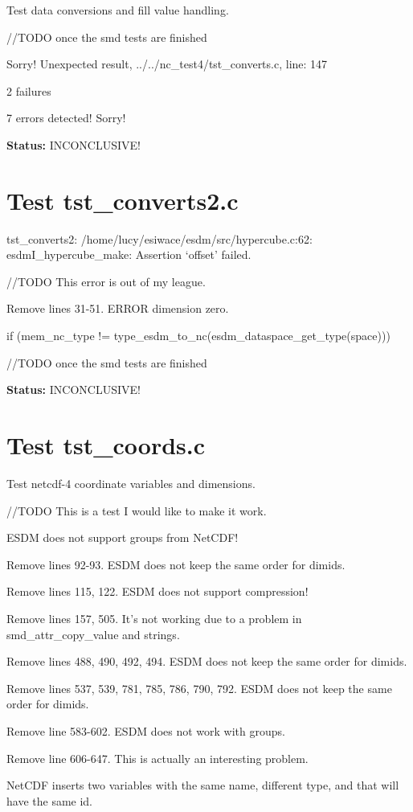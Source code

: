 Test data conversions and fill value handling.

//TODO once the smd tests are finished

Sorry! Unexpected result, ../../nc\_test4/tst\_converts.c, line: 147

2 failures

7 errors detected! Sorry!

{\bf \large Status: } INCONCLUSIVE!

\section{Test tst\_converts2.c}

tst\_converts2: /home/lucy/esiwace/esdm/src/hypercube.c:62: esdmI\_hypercube\_make: Assertion `offset' failed.

//TODO This error is out of my league.

Remove lines 31-51. ERROR dimension zero.

if (mem\_nc\_type != type\_esdm\_to\_nc(esdm\_dataspace\_get\_type(space)))

//TODO once the smd tests are finished

{\bf \large Status: } INCONCLUSIVE!

\section{Test tst\_coords.c}

Test netcdf-4 coordinate variables and dimensions.

//TODO This is a test I would like to make it work.

ESDM does not support groups from NetCDF!

Remove lines 92-93. ESDM does not keep the same order for dimids.

Remove lines 115, 122. ESDM does not support compression!

Remove lines 157, 505. It's not working due to a problem in smd\_attr\_copy\_value and strings.

Remove lines 488, 490, 492, 494. ESDM does not keep the same order for dimids.

Remove lines 537, 539, 781, 785, 786, 790, 792. ESDM does not keep the same order for dimids.

Remove line 583-602. ESDM does not work with groups.

Remove line 606-647. This is actually an interesting problem.

NetCDF inserts two variables with the same name, different type, and that will have the same id.

